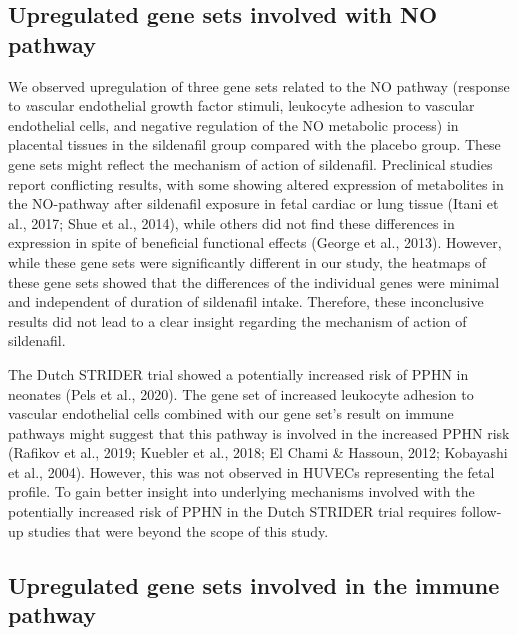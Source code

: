 \documentclass[authordate, empirical]{jote-new-article}
\begin{document}
\subsection{Upregulated gene sets involved with NO pathway }



We observed upregulation of three gene sets related to the NO pathway (response to \emph{v}ascular endothelial growth factor stimuli, leukocyte adhesion to vascular endothelial cells, and negative regulation of the NO metabolic process) in placental tissues in the sildenafil group compared with the placebo group. These gene sets might reflect the mechanism of action of sildenafil. Preclinical studies report conflicting results, with some showing altered expression of metabolites in the NO-pathway after sildenafil exposure in fetal cardiac or lung tissue (Itani et al., 2017; Shue et al., 2014), while others did not find these differences in expression in spite of beneficial functional effects (George et al., 2013). However, while these gene sets were significantly different in our study, the heatmaps of these gene sets showed that the differences of the individual genes were minimal and independent of duration of sildenafil intake. Therefore, these inconclusive results did not lead to a clear insight regarding the mechanism of action of sildenafil.



The Dutch STRIDER trial showed a potentially increased risk of PPHN in neonates (Pels et al., 2020). The gene set of increased leukocyte adhesion to vascular endothelial cells combined with our gene set's result on immune pathways might suggest that this pathway is involved in the increased PPHN risk (Rafikov et al., 2019; Kuebler et al., 2018; El Chami \& Hassoun, 2012; Kobayashi et al., 2004). However, this was not observed in HUVECs representing the fetal profile. To gain better insight into underlying mechanisms involved with the potentially increased risk of PPHN in the Dutch STRIDER trial requires follow-up studies that were beyond the scope of this study.







\subsection{Upregulated gene sets involved in the immune pathway }
\end{document}
